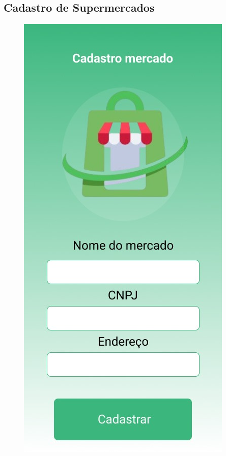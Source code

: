 \documentclass[12pt,oneside,a4paper,article]{abntex2}
\begin{document}
 \subsection{Cadastro de Supermercados}
   \begin{figure}[H]
        \centering
        \includegraphics[width=0.5\linewidth]{imagens-template//telas/cadastroSupermercado.jpg}
        \label{fig:placeholder}
    \end{figure}

                          
    \newpage                                        
\end{document}
